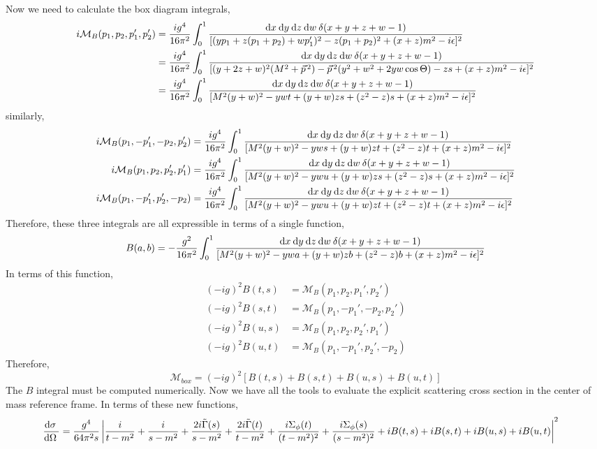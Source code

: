 \documentclass{article}
\begin{document}
Now we need to calculate the box diagram integrals,
\begin{align*}  
i\mathcal{M}_B(p_1, p_2, p_1', p_2') &= \frac{ig^4}{16 \pi^2} \int_{0}^{1} \frac{\mathrm{d}x \: \mathrm{d}y \: \mathrm{d}z \: \mathrm{d}w \: \delta(x + y + z + w - 1) }{[(y p_1 + z (p_1 + p_2) + w p_1' )^2 - z (p_1 + p_2)^2 + (x + z)m^2 - i \epsilon]^2} 
\\
& = \frac{ig^4}{16 \pi^2} \int_{0}^{1} \frac{\mathrm{d}x \: \mathrm{d}y \: \mathrm{d}z \: \mathrm{d}w \: \delta(x + y + z + w - 1) }{[(y + 2 z + w)^2 (M^2 + \vec{p}^{\, 2}) - \vec{p}^{\, 2}(y^2 + w^2 + 2 yw \cos{\Theta}) - z s + (x + z)m^2 - i \epsilon]^2} 
\\
& = \frac{ig^4}{16 \pi^2} \int_{0}^{1} \frac{\mathrm{d}x \: \mathrm{d}y \: \mathrm{d}z \: \mathrm{d}w \: \delta(x + y + z + w - 1) }{[M^2 (y + w)^2 - yw t + (y + w)z s + (z^2 - z)s + (x + z)m^2 - i \epsilon]^2} 
\end{align*}
similarly,
\begin{align*}  
i\mathcal{M}_B(p_1, -p_1', -p_2, p_2') & = \frac{ig^4}{16 \pi^2} \int_{0}^{1} \frac{\mathrm{d}x \: \mathrm{d}y \: \mathrm{d}z \: \mathrm{d}w \: \delta(x + y + z + w - 1) }{[M^2 (y + w)^2 - yw s + (y + w)z t + (z^2 - z) t + (x + z)m^2 - i \epsilon]^2} 
\\
i\mathcal{M}_B(p_1, p_2, p_2', p_1') & = \frac{ig^4}{16 \pi^2} \int_{0}^{1} \frac{\mathrm{d}x \: \mathrm{d}y \: \mathrm{d}z \: \mathrm{d}w \: \delta(x + y + z + w - 1) }{[M^2 (y + w)^2 - yw u + (y + w)z s + (z^2 - z) s + (x + z)m^2 - i \epsilon]^2} 
\\
i\mathcal{M}_B(p_1, -p_1', p_2', -p_2) & = \frac{ig^4}{16 \pi^2} \int_{0}^{1} \frac{\mathrm{d}x \: \mathrm{d}y \: \mathrm{d}z \: \mathrm{d}w \: \delta(x + y + z + w - 1) }{[M^2 (y + w)^2 - yw u + (y + w)z t + (z^2 - z) t + (x + z)m^2 - i \epsilon]^2} 
\end{align*}
Therefore, these three integrals are all expressible in terms of a single function,
\[ B(a,b) = -\frac{g^2}{16 \pi^2} \int_{0}^{1} \frac{\mathrm{d}x \: \mathrm{d}y \: \mathrm{d}z \: \mathrm{d}w \: \delta(x + y + z + w - 1) }{[M^2 (y + w)^2 - yw a + (y + w)z b + (z^2 - z) b + (x + z)m^2 - i \epsilon]^2} \]
In terms of this function,
\begin{align*}
(-ig)^2 B(t, s) &= \mathcal{M}_B(p_1, p_2, p_1', p_2') \\
(-ig)^2 B(s, t) &= \mathcal{M}_B(p_1, -p_1', -p_2, p_2') \\
(-ig)^2 B(u, s) &= \mathcal{M}_B(p_1, p_2, p_2', p_1') \\
(-ig)^2 B(u, t) &= \mathcal{M}_B(p_1, -p_1', p_2', -p_2) 
\end{align*}
Therefore,
\[\mathcal{M}_{box} = (-ig)^2[B(t, s) + B(s, t) + B(u, s) + B(u,t)]\]
The $B$ integral must be computed numerically.
Now we have all the tools to evaluate the explicit scattering cross section in the center of mass reference frame. In terms of these new functions,
\begin{align*}
\frac{\mathrm{d}\sigma \:}{\mathrm{d}\Omega \:} 
&= \frac{g^4}{64 \pi^2 s} \left| \frac{i}{t - m^2} + \frac{i}{s - m^2} + \frac{2i \tilde{\Gamma}(s)}{s - m^2} + \frac{2i \tilde{\Gamma}(t)}{t - m^2} + \frac{i \Sigma_\phi(t)}{(t - m^2)^2} + \frac{i \Sigma_\phi(s)}{(s - m^2)^2} + i B(t, s) + i B(s, t) + i B(u, s) + i B(u,t)  \right|^2 
\end{align*}
\end{document}
